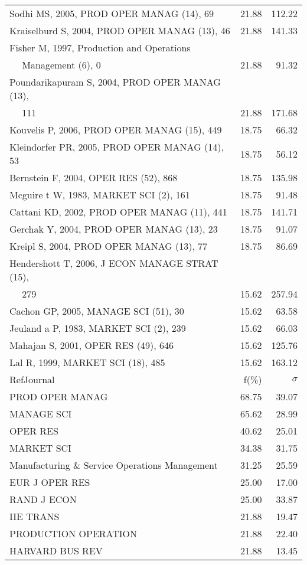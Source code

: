 \documentclass[a4paper,11pt]{report}
\begin{document}
\begin{landscape}
\begin{table}[!ht]
{\begin{tabular}{|l r r|}
Sodhi MS, 2005, PROD OPER MANAG (14), 69 & 21.88 & 112.22\\
Kraiselburd S, 2004, PROD OPER MANAG (13), 46 & 21.88 & 141.33\\
Fisher M, 1997, Production and Operations &  & \\
$\quad$ Management (6), 0 & 21.88 & 91.32\\
Poundarikapuram S, 2004, PROD OPER MANAG (13), &  & \\
$\quad$ 111 & 21.88 & 171.68\\
Kouvelis P, 2006, PROD OPER MANAG (15), 449 & 18.75 & 66.32\\
Kleindorfer PR, 2005, PROD OPER MANAG (14), 53 & 18.75 & 56.12\\
Bernstein F, 2004, OPER RES (52), 868 & 18.75 & 135.98\\
Mcguire t W, 1983, MARKET SCI (2), 161 & 18.75 & 91.48\\
Cattani KD, 2002, PROD OPER MANAG (11), 441 & 18.75 & 141.71\\
Gerchak Y, 2004, PROD OPER MANAG (13), 23 & 18.75 & 91.07\\
Kreipl S, 2004, PROD OPER MANAG (13), 77 & 18.75 & 86.69\\
Hendershott T, 2006, J ECON MANAGE STRAT (15), &  & \\
$\quad$ 279 & 15.62 & 257.94\\
Cachon GP, 2005, MANAGE SCI (51), 30 & 15.62 & 63.58\\
Jeuland a P, 1983, MARKET SCI (2), 239 & 15.62 & 66.03\\
Mahajan S, 2001, OPER RES (49), 646 & 15.62 & 125.76\\
Lal R, 1999, MARKET SCI (18), 485 & 15.62 & 163.12\\
\hline
\hline
RefJournal & f(\%) & $\sigma$\\
\hline
PROD OPER MANAG & 68.75 & 39.07\\
MANAGE SCI & 65.62 & 28.99\\
OPER RES & 40.62 & 25.01\\
MARKET SCI & 34.38 & 31.75\\
Manufacturing \& Service Operations Management & 31.25 & 25.59\\
EUR J OPER RES & 25.00 & 17.00\\
RAND J ECON & 25.00 & 33.87\\
IIE TRANS & 21.88 & 19.47\\
PRODUCTION OPERATION & 21.88 & 22.40\\
HARVARD BUS REV & 21.88 & 13.45\\
\hline
\end{tabular}
}
\end{table}

\end{landscape}
\end{document}
